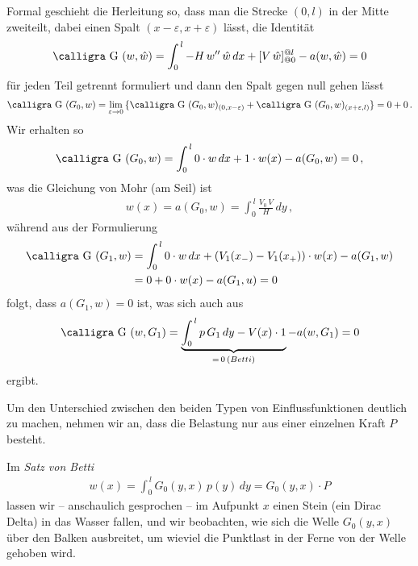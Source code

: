 {{{{Formal geschieht die Herleitung so, dass man die Strecke $(0,l)$ in der Mitte zweiteilt, dabei einen Spalt $(x-\varepsilon,x+\varepsilon)$ l\"{a}sst, die Identit\"{a}t
\begin{align}
\text{\normalfont\calligra G\,\,}(w,\hat{w}) = \int_0^{\,l} - H\,w''\,\hat{w}\,dx + [V\,\hat{w}]_{@0}^{@l} - a(w,\hat{w}) = 0
\end{align}
f\"{u}r jeden Teil getrennt formuliert und dann den Spalt gegen null gehen l\"{a}sst
\begin{align}
\text{\normalfont\calligra G\,\,}(G_0,w) = \lim_{\varepsilon \to 0}\,\{\text{\normalfont\calligra G\,\,}(G_0,w)_{(0,x-\varepsilon)} + \text{\normalfont\calligra G\,\,}(G_0,w)_{(x+\varepsilon,l)}\} = 0 + 0\,.
\end{align}
Wir erhalten so
\begin{align}
\text{\normalfont\calligra G\,\,}(G_0,w) = \int_0^{\,l} 0 \cdot w\,dx + 1 \cdot w(x) - a(G_0,w) = 0 \,,
\end{align}
was die Gleichung von Mohr (am Seil) ist
\begin{align}
w(x) = a(G_0,w) = \int_0^{\,l} \frac{V_0\,V}{H}\,dy\,,
\end{align}
w\"{a}hrend aus der Formulierung
\begin{align}
\text{\normalfont\calligra G\,\,}(G_1,w) &= \int_0^{\,l} 0 \cdot w\,dx + (V_1(x_{-}) - V_1(x_{+})) \cdot w(x) - a(G_1,w) \nn \\
&= 0 + 0 \cdot w(x) - a(G_1,u) = 0
\end{align}
folgt, dass $a(G_1,w) = 0$ ist, was sich auch aus
\begin{align}
\text{\normalfont\calligra G\,\,}(w,G_1) = \underbrace{\int_0^{\,l} p\,G_1\,dy - V(x) \cdot 1}_{=\, 0\,(Betti)} - a(w,G_1) = 0
\end{align}
ergibt.

\begin{remark}
Um den Unterschied zwischen den beiden Typen von Einflussfunktionen deutlich zu machen, nehmen wir an, dass die Belastung nur aus einer einzelnen Kraft $P$ besteht.

Im {\em Satz von Betti\/}
\begin{align}
w(x) = \int_0^{\,l} G_0(y,x)\,p(y)\,dy = G_0(y,x) \cdot P
\end{align}
lassen wir -- anschaulich gesprochen -- im Aufpunkt $x$ einen Stein (ein Dirac Delta) in das Wasser fallen, und wir beobachten, wie sich die Welle $G_0(y,x)$ \"{u}ber den Balken ausbreitet, um wieviel die Punktlast in der Ferne von der Welle gehoben wird.


\end{remark}}}}}
